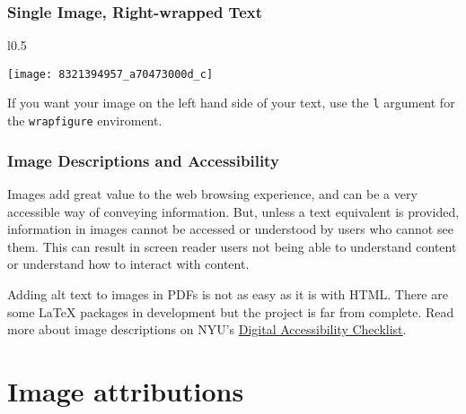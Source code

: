\documentclass[notitlepage]{nyu22report}
\begin{document}
\lipsum[1]

\subsection*{Single Image, Right-wrapped Text}

\begin{wrapfigure}{l}{0.5\textwidth}
    \begin{center}
      \texttt{[image: 8321394957\_a70473000d\_c]}
    \end{center}
  \end{wrapfigure}
If you want your image on the left hand side of your text, use the \texttt{l}
argument for the \texttt{wrapfigure} enviroment. 

\lipsum[2]

\subsection*{Image Descriptions and Accessibility}

Images add great value to the web browsing experience, and can be a very
accessible way of conveying information. But, unless a text equivalent is
provided, information in images cannot be accessed or understood by users who
cannot see them. This can result in screen reader users not being able to
understand content or understand how to interact with content.

Adding alt text to images in PDFs is not as easy as it is with HTML. There are
some \LaTeX{} packages in development but the project is far from complete. Read
more about image descriptions on NYU’s
\href{https://www.nyu.edu/life/information-technology/help-and-service-status/accessibility/accessibility-checklist/image-descriptions-text-alternative.html}{Digital
Accessibility Checklist}.

\appendix
\chapter{Image attributions}
\end{document}
